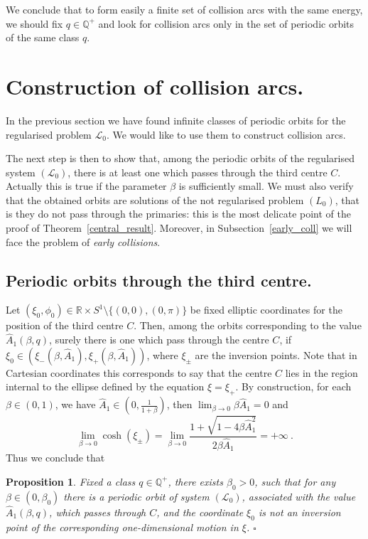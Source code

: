 \documentclass[a4paper]{article}
\newtheorem{proposition}{Proposition}
\begin{document}
We conclude that to form easily a finite set of collision arcs with
the same energy, we should fix $q \in {\mathbb{Q}}^+$ and look for collision
arcs only in the set of periodic orbits of the same class $q$.
 
\section{Construction of collision arcs.}
\label{collision}
In the previous section we have found infinite classes of periodic
orbits for the regularised problem $\mathcal{L}_0$. We would like to
use them to construct collision arcs.
 
The next step is then to show that, among the periodic orbits of the
regularised system $(\mathcal{L}_0)$, there is at least one which
passes through the third centre $C$.  Actually this is true if the
parameter $\beta$ is sufficiently small.  We must also verify that the
obtained orbits are solutions of the not regularised problem $(L_0)$,
that is they do not pass through the primaries: this is the most
delicate point of the proof of Theorem~\ref{central_result}.
Moreover, in Subsection~\ref{early_coll} we will face the problem of
\emph{early collisions}.

\subsection{Periodic orbits through the third centre.}
\label{coll_C}
Let $(\xi_0,\phi_0) \in {\mathbb{R}} \times S^1 \setminus \{(0,0),(0,\pi)\}$ be
fixed elliptic coordinates for the position of the third centre $C$.
Then, among the orbits corresponding to the value
$\hat{A}_1(\beta,q)$, surely there is one which pass through the
centre $C$, if $\xi_0 \in (\xi_-(\beta,\hat{A}_1),
\xi_+(\beta,\hat{A}_1))$, where $\xi_{\pm}$ are the inversion points.
Note that in Cartesian coordinates this corresponds to say that the
centre $C$ lies in the region internal to the ellipse defined by the
equation $\xi=\xi_+$.
By construction, for each $\beta \in (0,1)$, we have $\hat{A}_1 \in
(0, \frac{1}{1+\beta})$, then $\lim_{\beta \rightarrow 0}\beta
\hat{A}_1=0$ and
\[
\lim_{\beta \rightarrow 0} \cosh(\xi_{\pm})= 
\lim_{\beta \rightarrow 0} \frac{1+\sqrt{1-4\beta\hat{A}_1^2}}{2\beta\hat{A}_1}=
+\infty
\ .
\]
Thus we conclude that
\begin{proposition}
  \label{collisionC}
  Fixed a class $q \in {\mathbb{Q}}^+$,
  there exists $\beta_0>0$, such that for any $\beta \in (0,\beta_0)$
  there is a  periodic orbit of system $(\mathcal{L}_0)$, 
  associated with the value $\hat{A}_1(\beta,q)$, which passes through $C$, 
  and the coordinate $\xi_0$ is not an 
  inversion point of the corresponding one-dimensional motion in $\xi$. 
{$\square$\\}
\end{proposition} 
\end{document}
